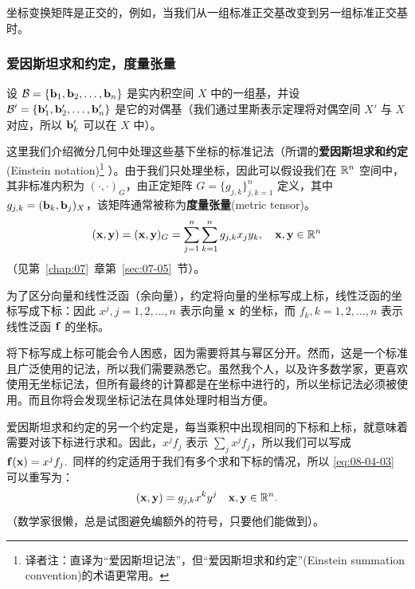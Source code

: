 坐标变换矩阵是正交的，例如，当我们从一组标准正交基改变到另一组标准正交基时。

\subsubsection{爱因斯坦求和约定，度量张量}\label{sec:08-04-03-01}


设 $\mathcal{B} = \{\mathbf{b}_1, \mathbf{b}_2, \dots, \mathbf{b}_n\}$ 是实内积空间 $X$ 中的一组基，并设 $\mathcal{B}' = \{\mathbf{b}'_1, \mathbf{b}'_2, \dots, \mathbf{b}'_n\}$ 是它的对偶基（我们通过里斯表示定理将对偶空间 $X'$ 与 $X$ 对应，所以 $\mathbf{b}'_k$ 可以在 $X$ 中）。

这里我们介绍微分几何中处理这些基下坐标的标准记法（所谓的\textbf{爱因斯坦求和约定}(Einstein notation)\footnote{
译者注：直译为“爱因斯坦记法”，但“爱因斯坦求和约定”(Einstein summation convention)的术语更常用。
}
）。由于我们只处理坐标，因此可以假设我们在 $\mathbb{R}^n$ 空间中，其非标准内积为 $( \cdot, \cdot )_G$，由正定矩阵 $G = \{g_{j,k}\}^{n}_{j,k=1}$ 定义，其中 $g_{j,k} = (\mathbf{b}_k, \mathbf{b}_j)_X$，该矩阵通常被称为\textbf{度量张量}(metric tensor)。
\begin{equation}\label{eq:08-04-03}
(\mathbf{x}, \mathbf{y}) = (\mathbf{x}, \mathbf{y})_G = \sum_{j=1}^n \sum_{k=1}^n g_{j,k} x_j y_k, \quad \mathbf{x}, \mathbf{y} \in \mathbb{R}^n
\end{equation}
（见第~\ref{chap:07}~章第~\ref{sec:07-05}~节）。



为了区分向量和线性泛函（余向量），约定将向量的坐标写成上标，线性泛函的坐标写成下标：因此 $x^j, j = 1, 2, \dots, n$ 表示向量 $\mathbf{x}$ 的坐标，而 $f_k, k = 1, 2, \dots, n$ 表示线性泛函 $\mathbf{f}$ 的坐标。

\begin{remark*}
将下标写成上标可能会令人困惑，因为需要将其与幂区分开。然而，这是一个标准且广泛使用的记法，所以我们需要熟悉它。虽然我个人，以及许多数学家，更喜欢使用无坐标记法，但所有最终的计算都是在坐标中进行的，所以坐标记法必须被使用。而且你将会发现坐标记法在具体处理时相当方便。
\end{remark*}

爱因斯坦求和约定的另一个约定是，每当乘积中出现相同的下标和上标，就意味着需要对该下标进行求和。因此，$x^j f_j$ 表示 $\sum_j x^j f_j$，所以我们可以写成 $\mathbf{f}(\mathbf{x}) = x^j f_j$.~同样的约定适用于我们有多个求和下标的情况，所以 \eqref{eq:08-04-03} 可以重写为：
\begin{equation}\label{eq:08-04-04}
(\mathbf{x}, \mathbf{y}) = g_{j,k} x^k y^j \quad \mathbf{x}, \mathbf{y} \in \mathbb{R}^n .
\end{equation}
（数学家很懒，总是试图避免编额外的符号，只要他们能做到）。

